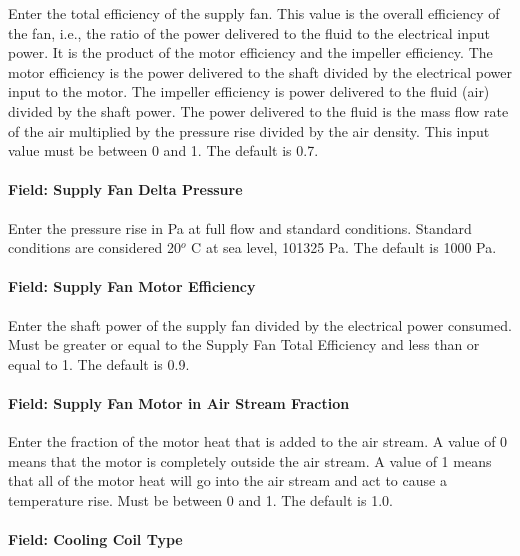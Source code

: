 Enter the total efficiency of the supply fan. This value is the overall efficiency of the fan, i.e., the ratio of the power delivered to the fluid to the electrical input power. It is the product of the motor efficiency and the impeller efficiency. The motor efficiency is the power delivered to the shaft divided by the electrical power input to the motor. The impeller efficiency is power delivered to the fluid (air) divided by the shaft power. The power delivered to the fluid is the mass flow rate of the air multiplied by the pressure rise divided by the air density. This input value must be between 0 and 1. The default is 0.7.

\paragraph{Field: Supply Fan Delta Pressure}\label{field-supply-fan-delta-pressure-8}

Enter the pressure rise in Pa at full flow and standard conditions. Standard conditions are considered 20\(^{o}\) C at sea level, 101325 Pa. The default is 1000 Pa.

\paragraph{Field: Supply Fan Motor Efficiency}\label{field-supply-fan-motor-efficiency-9}

Enter the shaft power of the supply fan divided by the electrical power consumed. Must be greater or equal to the Supply Fan Total Efficiency and less than or equal to 1. The default is 0.9.

\paragraph{Field: Supply Fan Motor in Air Stream Fraction}\label{field-supply-fan-motor-in-air-stream-fraction-5}

Enter the fraction of the motor heat that is added to the air stream. A value of 0 means that the motor is completely outside the air stream. A value of 1 means that all of the motor heat will go into the air stream and act to cause a temperature rise. Must be between 0 and 1. The default is 1.0.

\paragraph{Field: Cooling Coil Type}\label{field-cooling-coil-type-9}

